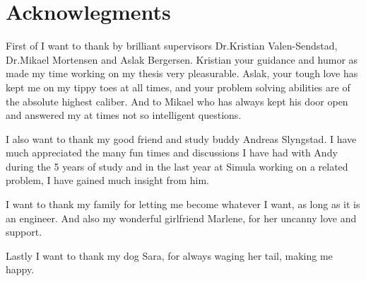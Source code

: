 \section*{Acknowlegments}
First of I want to thank by brilliant supervisors Dr.Kristian Valen-Sendstad, Dr.Mikael Mortensen and Aslak Bergersen. Kristian your guidance and humor as made my time working on my thesis very pleasurable. Aslak, your tough love has kept me on my tippy toes at all times, and your problem solving abilities are of the absolute highest caliber. And to Mikael who has always kept his door open and answered my at times not so intelligent questions.

I also want to thank my good friend and study buddy Andreas Slyngstad. I have much appreciated the many fun times and discussions I have had with Andy during the 5 years of study and in the last year at Simula working on a related problem, I have gained much insight from him.							
				
I want to thank my family for letting me become whatever I want, as long as it is an engineer. And also my wonderful girlfriend Marlene, for her uncanny love and support.

Lastly I want to thank my dog Sara, for always waging her tail, making me happy.